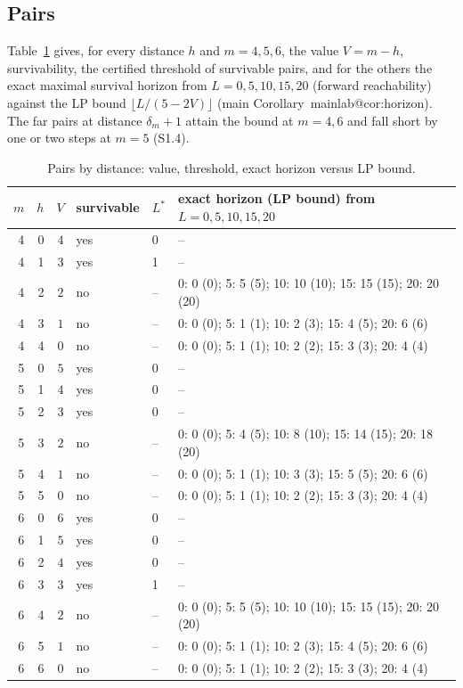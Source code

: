 \documentclass[11pt,a4paper]{article}
\makeatletter
\theoremstyle{plain}
\theoremstyle{definition}
\theoremstyle{remark}
\newcommand{\mref}[1]{\csname mainlab@#1\endcsname}
\makeatother
\begin{document}
\subsection{Pairs}
Table~\ref{tab:S2pairs} gives, for every distance $h$ and $m=4,5,6$, the value $V=m-h$, survivability, the certified threshold of survivable pairs, and for the others the exact maximal survival horizon from $L=0,5,10,15,20$ (forward reachability) against the LP bound $\lfloor L/(5-2V)\rfloor$ (main Corollary~\mref{cor:horizon}). The far pairs at distance $\delta_m+1$ attain the bound at $m=4,6$ and fall short by one or two steps at $m=5$ (S1.4).
\begin{table}[H]\centering\scriptsize
\caption{Pairs by distance: value, threshold, exact horizon versus LP bound.}\label{tab:S2pairs}
\begin{tabular}{rrrlll}
\toprule
$m$ & $h$ & $V$ & survivable & $L^\ast$ & exact horizon (LP bound) from $L=0,5,10,15,20$\\
\midrule
4 & 0 & $4$ & yes & 0 & -- \\
4 & 1 & $3$ & yes & 1 & -- \\
4 & 2 & $2$ & no & -- & 0: 0 (0); 5: 5 (5); 10: 10 (10); 15: 15 (15); 20: 20 (20)\\
4 & 3 & $1$ & no & -- & 0: 0 (0); 5: 1 (1); 10: 2 (3); 15: 4 (5); 20: 6 (6)\\
4 & 4 & $0$ & no & -- & 0: 0 (0); 5: 1 (1); 10: 2 (2); 15: 3 (3); 20: 4 (4)\\
5 & 0 & $5$ & yes & 0 & -- \\
5 & 1 & $4$ & yes & 0 & -- \\
5 & 2 & $3$ & yes & 0 & -- \\
5 & 3 & $2$ & no & -- & 0: 0 (0); 5: 4 (5); 10: 8 (10); 15: 14 (15); 20: 18 (20)\\
5 & 4 & $1$ & no & -- & 0: 0 (0); 5: 1 (1); 10: 3 (3); 15: 5 (5); 20: 6 (6)\\
5 & 5 & $0$ & no & -- & 0: 0 (0); 5: 1 (1); 10: 2 (2); 15: 3 (3); 20: 4 (4)\\
6 & 0 & $6$ & yes & 0 & -- \\
6 & 1 & $5$ & yes & 0 & -- \\
6 & 2 & $4$ & yes & 0 & -- \\
6 & 3 & $3$ & yes & 1 & -- \\
6 & 4 & $2$ & no & -- & 0: 0 (0); 5: 5 (5); 10: 10 (10); 15: 15 (15); 20: 20 (20)\\
6 & 5 & $1$ & no & -- & 0: 0 (0); 5: 1 (1); 10: 2 (3); 15: 4 (5); 20: 6 (6)\\
6 & 6 & $0$ & no & -- & 0: 0 (0); 5: 1 (1); 10: 2 (2); 15: 3 (3); 20: 4 (4)\\
\bottomrule
\end{tabular}
\end{table}
\end{document}
